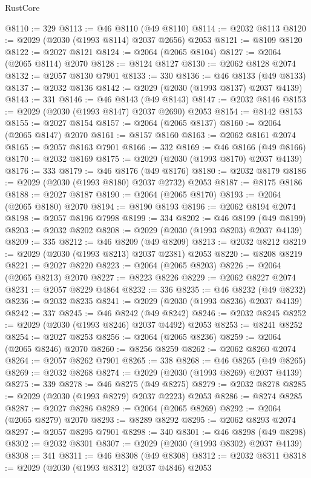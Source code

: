 \begin{lexlean}{RustCore}
\begin{coremodule}
@8110 := 329
@8113 := @46 @8110 (@49 @8110)
@8114 := @2032 @8113
@8120 := @2029 (@2030 (@1993 @8114) @2037 @2656) @2053
@8121 := @8109 @8120
@8122 := @2027 @8121
@8124 := @2064 (@2065 @8104)
@8127 := @2064 (@2065 @8114) @2070
@8128 := @8124 @8127
@8130 := @2062 @8128 @2074
@8132 := @2057 @8130 @7901
@8133 := 330
@8136 := @46 @8133 (@49 @8133)
@8137 := @2032 @8136
@8142 := @2029 (@2030 (@1993 @8137) @2037 @4139)
@8143 := 331
@8146 := @46 @8143 (@49 @8143)
@8147 := @2032 @8146
@8153 := @2029 (@2030 (@1993 @8147) @2037 @2690) @2053
@8154 := @8142 @8153
@8155 := @2027 @8154
@8157 := @2064 (@2065 @8137)
@8160 := @2064 (@2065 @8147) @2070
@8161 := @8157 @8160
@8163 := @2062 @8161 @2074
@8165 := @2057 @8163 @7901
@8166 := 332
@8169 := @46 @8166 (@49 @8166)
@8170 := @2032 @8169
@8175 := @2029 (@2030 (@1993 @8170) @2037 @4139)
@8176 := 333
@8179 := @46 @8176 (@49 @8176)
@8180 := @2032 @8179
@8186 := @2029 (@2030 (@1993 @8180) @2037 @2732) @2053
@8187 := @8175 @8186
@8188 := @2027 @8187
@8190 := @2064 (@2065 @8170)
@8193 := @2064 (@2065 @8180) @2070
@8194 := @8190 @8193
@8196 := @2062 @8194 @2074
@8198 := @2057 @8196 @7998
@8199 := 334
@8202 := @46 @8199 (@49 @8199)
@8203 := @2032 @8202
@8208 := @2029 (@2030 (@1993 @8203) @2037 @4139)
@8209 := 335
@8212 := @46 @8209 (@49 @8209)
@8213 := @2032 @8212
@8219 := @2029 (@2030 (@1993 @8213) @2037 @2381) @2053
@8220 := @8208 @8219
@8221 := @2027 @8220
@8223 := @2064 (@2065 @8203)
@8226 := @2064 (@2065 @8213) @2070
@8227 := @8223 @8226
@8229 := @2062 @8227 @2074
@8231 := @2057 @8229 @4864
@8232 := 336
@8235 := @46 @8232 (@49 @8232)
@8236 := @2032 @8235
@8241 := @2029 (@2030 (@1993 @8236) @2037 @4139)
@8242 := 337
@8245 := @46 @8242 (@49 @8242)
@8246 := @2032 @8245
@8252 := @2029 (@2030 (@1993 @8246) @2037 @4492) @2053
@8253 := @8241 @8252
@8254 := @2027 @8253
@8256 := @2064 (@2065 @8236)
@8259 := @2064 (@2065 @8246) @2070
@8260 := @8256 @8259
@8262 := @2062 @8260 @2074
@8264 := @2057 @8262 @7901
@8265 := 338
@8268 := @46 @8265 (@49 @8265)
@8269 := @2032 @8268
@8274 := @2029 (@2030 (@1993 @8269) @2037 @4139)
@8275 := 339
@8278 := @46 @8275 (@49 @8275)
@8279 := @2032 @8278
@8285 := @2029 (@2030 (@1993 @8279) @2037 @2223) @2053
@8286 := @8274 @8285
@8287 := @2027 @8286
@8289 := @2064 (@2065 @8269)
@8292 := @2064 (@2065 @8279) @2070
@8293 := @8289 @8292
@8295 := @2062 @8293 @2074
@8297 := @2057 @8295 @7901
@8298 := 340
@8301 := @46 @8298 (@49 @8298)
@8302 := @2032 @8301
@8307 := @2029 (@2030 (@1993 @8302) @2037 @4139)
@8308 := 341
@8311 := @46 @8308 (@49 @8308)
@8312 := @2032 @8311
@8318 := @2029 (@2030 (@1993 @8312) @2037 @4846) @2053

\end{coremodule}
\end{lexlean}
